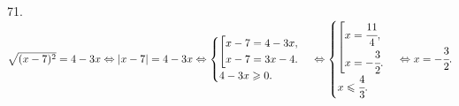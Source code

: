71. $\sqrt{(x-7)^2}=4-3x\Leftrightarrow|x-7|=4-3x\Leftrightarrow\begin{cases}\left[
      \begin{gathered} x-7=4-3x,\hfill\\
      x-7=3x-4.\hfill \end{gathered}\right.\\
4-3x\geqslant0.\end{cases}\Leftrightarrow\begin{cases}\left[
      \begin{gathered} x=\cfrac{11}{4},\hfill\\
      x=-\cfrac{3}{2}.\hfill \end{gathered}\right.\\
x\leqslant\cfrac{4}{3}.\end{cases}\Leftrightarrow x=-\cfrac{3}{2}.$\\
